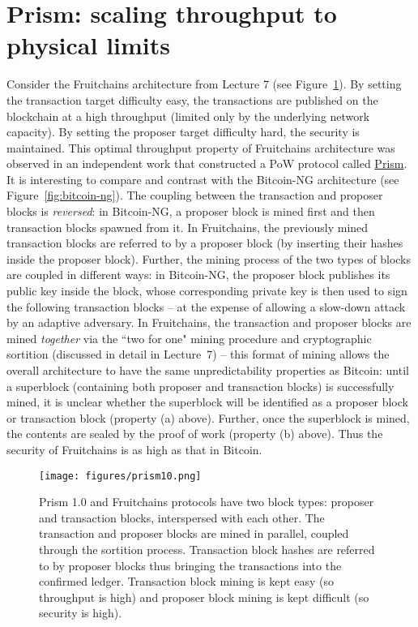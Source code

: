 \documentclass{article}
\begin{document}
\section*{{\sf Prism}: scaling throughput to physical limits }
Consider the {\sf Fruitchains} architecture from Lecture 7 (see Figure~\ref{fig:prism10}). By setting the transaction  target  difficulty easy, the transactions are published on the blockchain at a high throughput (limited only by the underlying network capacity).  By setting the proposer target difficulty hard, the security is maintained. This optimal throughput property of {\sf Fruitchains} architecture was observed in an independent work that constructed a PoW protocol called \href{https://arxiv.org/pdf/1810.08092v3.pdf}{{\sf Prism}}. It is interesting to compare and contrast with the {\sf Bitcoin-NG} architecture (see Figure~\ref{fig:bitcoin-ng}). The coupling between the transaction and proposer blocks is {\em reversed}: in {\sf Bitcoin-NG}, a proposer block is mined first and then transaction blocks spawned from it. In {\sf Fruitchains}, the previously mined transaction blocks are referred to by a proposer block (by inserting their hashes inside the proposer block). Further, the mining process of the two types of blocks are coupled in different ways: in {\sf Bitcoin-NG}, the proposer block publishes its public key inside the block, whose corresponding private key is then used to sign the following transaction blocks -- at the expense of allowing a slow-down attack by an adaptive adversary. In {\sf Fruitchains}, the transaction and proposer blocks are mined {\em together} via the ``two for one" mining procedure and cryptographic sortition (discussed in detail in Lecture~7) -- this format of mining allows the overall architecture to have the same unpredictability properties as {\sf Bitcoin}: until a superblock (containing both proposer and transaction blocks) is successfully mined, it is unclear whether the superblock will be identified as a proposer block or transaction block (property (a) above). Further, once the superblock is mined, the contents are sealed by the proof of work (property (b) above). Thus the security of {\sf Fruitchains} is as high as that in {\sf Bitcoin}. 


 \begin{figure}
     \centering
     \texttt{[image: figures/prism10.png]}
   \caption{{\sf Prism 1.0} and {\sf Fruitchains} protocols have two block types: proposer and transaction blocks, interspersed with each other. The transaction and proposer blocks are mined in parallel, coupled through the sortition process. Transaction block   hashes are referred to by proposer blocks thus bringing the transactions into the confirmed ledger. Transaction block mining is kept easy (so throughput is high) and proposer block mining is kept difficult (so security is high).   }
   \label{fig:prism10}
 \end{figure}
\end{document}

